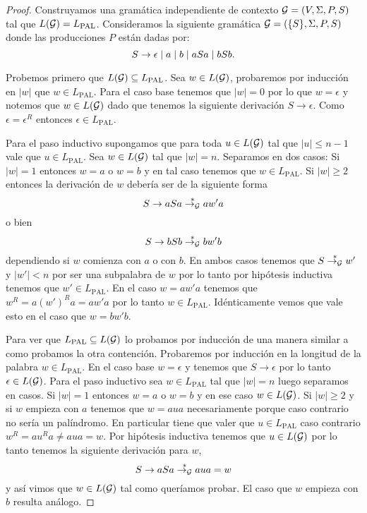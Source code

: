 \documentclass[tesis.tex]{subfiles}
\begin{document}
\begin{proof}
	Construyamos una gramática independiente de contexto ${\cal G} = (V, \Sigma, P, S)$ tal que $L({\cal G}) = L_{\text{PAL}}$.
	Consideramos la siguiente gramática ${\cal G}  =  (\{S\}, \Sigma, P, S )$ donde las producciones $P$ están dadas por:
	\begin{equation*}
		S  \to \epsilon \\ \mid a  \mid  b \\ \mid aSa \\ \mid bSb. \\
	\end{equation*}
		

	Probemos primero que $L({\cal G}) \subseteq L_{\text{PAL}}$.
	Sea $w \in L({\cal G})$, probaremos por inducción en $|w|$ que $w \in L_{\text{PAL}}$.
	Para el caso base tenemos que $|w|=0$ por lo que $w = \epsilon$ y notemos que
	$w \in L({\cal G})$ dado que tenemos la siguiente derivación $S \to \epsilon$.
	Como $\epsilon = \epsilon^R$ entonces $\epsilon \in L_{\text{PAL}}$.
	
	Para el paso inductivo supongamos que para toda $u \in L({\cal G})$ tal que $|u| \le n-1$ vale que $u \in L_{\text{PAL}}$.
	Sea $w \in L({\cal G})$ tal que $|w| = n$. 
	Separamos en dos casos:
	Si $|w| = 1$ entonces $w=a$ o $w = b$ y en tal caso tenemos que $w\in L_{\text{PAL}}$.
	Si $|w| \ge 2$ entonces la derivación de $w$ debería ser de la siguiente forma 
	\[
		S \to aSa \overset{*}{\to_{\cal G}} aw'a
	\]
	o bien 
	\[
		S \to bSb \overset{*}{\to_{\cal G}} bw'b
	\]
	dependiendo si $w$ comienza con $a$ o con $b$.
	En ambos casos tenemos que $S \overset{*}{\to_{\cal G}} w'$ y $|w'| < n$ por ser una subpalabra de $w$ por lo tanto por hipótesis inductiva tenemos que $w' \in L_{\text{PAL}}$.
	En el caso $w = aw'a$ tenemos que $w^R = a(w')^Ra = aw'a$ por lo tanto $w \in L_{\text{PAL}}$. 
	Idénticamente vemos que vale esto en el caso que $w = bw'b$.
	
	
	Para ver que $L_{\text{PAL}} \subseteq L({\cal G})$ lo probamos por inducción de una manera similar a como probamos la otra contención.
	Probaremos por inducción en la longitud de la palabra $w \in L_{\text{PAL}}$.
	En el caso base $w = \epsilon$ y tenemos que $S \to \epsilon$ por lo tanto $\epsilon \in L({\cal G})$.
	Para el paso inductivo sea $w \in L_{\text{PAL}}$ tal que $|w|=n$ luego separamos en casos.
	Si $|w| = 1$ entonces $w = a$ o $w = b$ y en ese caso $w \in L({\cal G})$.
	Si $|w| \ge 2$ y si $w$ empieza con $a$ tenemos que $w = aua$ necesariamente porque caso contrario no sería un palíndromo. 
	En particular tiene que valer que $u \in L_{\text{PAL}}$ caso contrario $w^R = au^Ra \neq aua = w$. 
	Por hipótesis inductiva tenemos que $u \in L({\cal G})$ por lo tanto tenemos la siguiente derivación para $w$,
	\[
		S \to aSa \overset{*}{\to_{\cal G}} aua = w
	\]
	y así vimos que $w \in L({\cal G})$ tal como queríamos probar.
	El caso que $w$ empieza con $b$ resulta análogo.
	
\end{proof}
\end{document}
